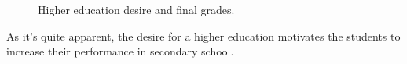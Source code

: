 \documentclass[a4paper, 11pt]{article}
\begin{document}
\begin{figure}[h!]
\begin{subfigure}[b]{0.2\linewidth}
		\end{subfigure}
		\caption*{Higher education desire and final grades.}
		\label{fig:higher_grades}
	\end{figure}
	
	As it's quite apparent, the desire for a higher education motivates the students to increase their performance in secondary school.
	
\end{document}
